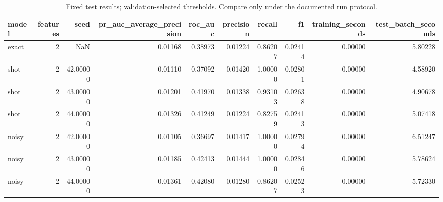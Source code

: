 \begin{table}
\caption{Fixed test results; validation-selected thresholds. Compare only under the documented run protocol.}
\begin{tabular}{lrrrrrrrrr}
\toprule
model & features & seed & pr\_auc\_average\_precision & roc\_auc & precision & recall & f1 & training\_seconds & test\_batch\_seconds \\
\midrule
exact & 2 & NaN & 0.01168 & 0.38973 & 0.01224 & 0.86207 & 0.02414 & 0.00000 & 5.80228 \\
shot & 2 & 42.00000 & 0.01110 & 0.37092 & 0.01420 & 1.00000 & 0.02801 & 0.00000 & 4.58920 \\
shot & 2 & 43.00000 & 0.01201 & 0.41970 & 0.01338 & 0.93103 & 0.02638 & 0.00000 & 4.90678 \\
shot & 2 & 44.00000 & 0.01326 & 0.41249 & 0.01224 & 0.82759 & 0.02413 & 0.00000 & 5.07418 \\
noisy & 2 & 42.00000 & 0.01105 & 0.36697 & 0.01417 & 1.00000 & 0.02794 & 0.00000 & 6.51247 \\
noisy & 2 & 43.00000 & 0.01185 & 0.42413 & 0.01444 & 1.00000 & 0.02846 & 0.00000 & 5.78624 \\
noisy & 2 & 44.00000 & 0.01361 & 0.42080 & 0.01280 & 0.86207 & 0.02523 & 0.00000 & 5.72330 \\
\bottomrule
\end{tabular}
\end{table}

